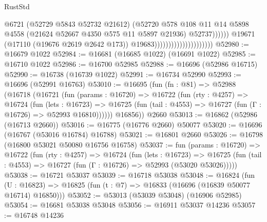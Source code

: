 \begin{lexlean}{RustStd}
\begin{coremodule}
                                                        @6721
                                                        (@52729 @5843 @52732 @21612)
                                                        (@52720
                                                          @578
                                                          @108
                                                          @11
                                                          @14
                                                          @5898
                                                          @4558
                                                          (@21624
                                                            @52667
                                                            @4350
                                                            @575
                                                            @11
                                                            @5897
                                                            @21936)
                                                          @52737))))))
                                              @19671
                                              (@17110 (@19676 @2619 @2642 @173))
                                              @19683)))))))))))))))))))))
@52980 := @16679 @1022
@52984 := @16681 (@16685 @1022) (@16691 @1022)
@52985 := @16710 @1022
@52986 := @16700 @52985
@52988 := @16696 (@52986 @16715)
@52990 := @16738 (@16739 @1022)
@52991 := @16734 @52990
@52993 := @16696 (@52991 @16763)
@53010 := @16695
    (fun (fn : @81) =>
    @52988
      (@16718
        (@16721
          (fun (params : @16720) =>
          @16722
            (fun (rty : @4257) =>
            @16724
              (fun (lets : @16723) =>
              @16725 (fun (tail : @4553) => @16727 (fun (Γ : @16726) => @52993 @16810))))))
        @16856))
    @2660
@53013 := @16862 (@52986 (@16713 @2660))
@53016 := @16775 (@16776 @2660) @50077
@53020 := @16696 (@16767 (@53016 @16784) @16788)
@53021 := @16801 @2660
@53026 := @16798 (@16800 @53021 @50080 @16756 @16758)
@53037 := fun (params : @16720) =>
  @16722
    (fun (rty : @4257) =>
    @16724
      (fun (lets : @16723) =>
      @16725 (fun (tail : @4553) => @16727 (fun (Γ : @16726) => @52993 (@53020 @53026)))))
@53038 := @16721 @53037
@53039 := @16718 @53038
@53048 := @16824
    (fun (U : @16823) => @16825 (fun (t : @7) => @16833 (@16696 (@16839 @50077 @16714) @16850)))
@53052 := @53013 (@53039 @53048) (@16906 @52985)
@53054 := @16681 @53038 @53048
@53056 := @16911 @53037 @14236
@53057 := @16748 @14236

\end{coremodule}
\end{lexlean}
